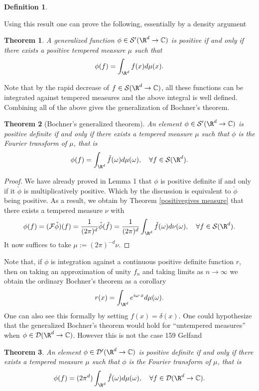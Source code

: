 \documentclass[12pt]{article}
\newtheorem{theorem}{Theorem}
\newtheorem{definition}{Definition}
\begin{document}
\begin{CJK*}{UTF8}{gbsn}
\begin{definition}
	\end{definition}

	Using this result one can prove the following, essentially by a density argument
	\begin{theorem}
		A generalized function $\phi\in \mathcal{S}'(\R^d\to\C)$ is positive if and only if there exists a positive tempered measure $\mu $ such that
		\begin{equation*}
			\phi(f)=\int_{\R^d} f(x)d\mu(x).
		\end{equation*}
	\end{theorem}
	Note that by the rapid decrease of $f\in \Ss(\R^d\to\C)$, all these functions can be integrated against tempered measures and the above integral is well defined. Combining all of the above gives the generalization of Bochner's theorem.
	\begin{theorem}[Bochner's generalized theorem]
		An element $\phi\in \Ss'(\R^d\to\C)$ is positive definite if and only if there exists a tempered measure $\mu $ such that $\phi$ is the Fourier transform of $\mu $, that is
		\begin{equation*}
			\phi(f)=\int_{\R^d} \check{f}(\omega) d \mu (\omega),\quad\forall f\in \Ss(\R^d).
		\end{equation*}

	\end{theorem}
	\begin{proof}
		We have already proved in Lemma 1 that $\phi$ is positive definite if and only if it $\check{\phi}$ is multiplicatively positive. Which by the discussion is equivalent to $\check{\phi}$ being positive. As  a result, we obtain by Theorem \ref{positivegives measure} that there exists a tempered measure $\nu $ with
		\begin{equation*}
			\phi(f)=(\Ff\check{\phi})(f)=\frac{1}{(2\pi)^{d}}\check{\phi}(\check{f})=\frac{1}{(2\pi)^{d}}\int_{\R^d} \check{f}(\omega) d \nu (\omega),\quad\forall f\in \Ss(\R^d).
		\end{equation*}
		It now suffices to take $\mu :=(2\pi )^{-d} \nu$.
	\end{proof}
	Note that, if $\phi$ is integration against a continuous positive definite function $r$, then on taking an approximation of unity  $f_n$ and taking limits as $n\to\infty$ we obtain the ordinary Bochner's theorem as a corollary
	\begin{equation*}
		r(x)=\int_{\R^d}e^{i\omega \cdot x} d \mu(\omega) .
	\end{equation*}
	One can also see this formally by setting $f(x)=\delta (x)$. One could hypothesize that the generalized Bochner's theorem would hold for ``untempered measures'' when $\phi\in \mathcal{D}(\R^d\to\C)$. However this is not the case 159 Gelfand
	\begin{theorem}
		An element $\phi\in \mathcal{D}'(\R^d\to \C)$ is positive definite if and only if there exists a tempered measure $\mu $ such that $\phi$ is the Fourier transform of $\mu $, that is
		\begin{equation*}
			\phi(f)=(2\pi^d)\int_{\R^d} \hat{f}(\omega) d \mu (\omega),\quad\forall f\in \mathcal{D}(\R^d\to\C).
		\end{equation*}


\end{theorem}
\end{CJK*}
\end{document}
